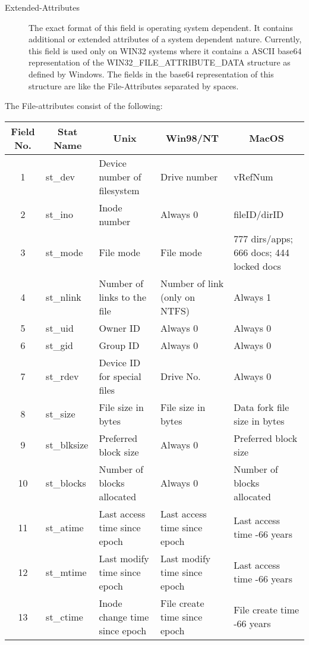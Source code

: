 \begin{description}
\item [Extended-Attributes]
   The exact format of this field is  operating system dependent. It contains
additional or extended  attributes of a system dependent nature. Currently,
this field is  used only on WIN32 systems where it contains a ASCII base64
representation of the WIN32\_FILE\_ATTRIBUTE\_DATA structure as defined  by
Windows. The fields in the base64 representation of this structure  are like
the File-Attributes separated by spaces.
\end{description}

The File-attributes consist of the following:

\begin{longtable}{|p{0.6in}|p{0.7in}|p{1in}|p{1in}|p{1.4in}|}
 \hline
\multicolumn{1}{|c|}{\bf Field No. } & \multicolumn{1}{c|}{\bf Stat Name }
& \multicolumn{1}{c|}{\bf Unix } & \multicolumn{1}{c|}{\bf Win98/NT } &
\multicolumn{1}{c|}{\bf MacOS } \\
 \hline
\multicolumn{1}{|c|}{1 } & {st\_dev } & {Device number of filesystem } &
{Drive number } & {vRefNum } \\
 \hline
\multicolumn{1}{|c|}{2 } & {st\_ino } & {Inode number } & {Always 0 } &
{fileID/dirID } \\
 \hline
\multicolumn{1}{|c|}{3 } & {st\_mode } & {File mode } & {File mode } &
{777 dirs/apps; 666 docs; 444 locked docs } \\
 \hline
\multicolumn{1}{|c|}{4 } & {st\_nlink } & {Number of links to the file } &
{Number of link (only on NTFS) } & {Always 1 } \\
 \hline
\multicolumn{1}{|c|}{5 } & {st\_uid } & {Owner ID } & {Always 0 } &
{Always 0 } \\
 \hline
\multicolumn{1}{|c|}{6 } & {st\_gid } & {Group ID } & {Always 0 } &
{Always 0 } \\
 \hline
\multicolumn{1}{|c|}{7 } & {st\_rdev } & {Device ID for special files } &
{Drive No. } & {Always 0 } \\
 \hline
\multicolumn{1}{|c|}{8 } & {st\_size } & {File size in bytes } & {File
size in bytes } & {Data fork file size in bytes } \\
 \hline
\multicolumn{1}{|c|}{9 } & {st\_blksize } & {Preferred block size } &
{Always 0 } & {Preferred block size } \\
 \hline
\multicolumn{1}{|c|}{10 } & {st\_blocks } & {Number of blocks allocated }
& {Always 0 } & {Number of blocks allocated } \\
 \hline
\multicolumn{1}{|c|}{11 } & {st\_atime } & {Last access time since epoch }
& {Last access time since epoch } & {Last access time -66 years } \\
 \hline
\multicolumn{1}{|c|}{12 } & {st\_mtime } & {Last modify time since epoch }
& {Last modify time since epoch } & {Last access time -66 years } \\
 \hline
\multicolumn{1}{|c|}{13 } & {st\_ctime } & {Inode change time since epoch
} & {File create time since epoch } & {File create time -66 years}
\\ \hline

\end{longtable}

